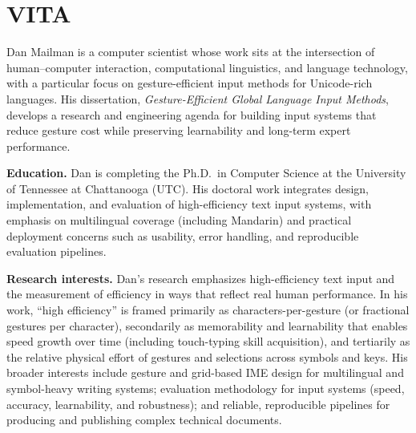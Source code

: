 

\cleardoublepage
\chapter*{VITA}


Dan Mailman is a computer scientist whose work sits at the intersection of human--computer interaction, computational linguistics, and language technology, with a particular focus on gesture-efficient input methods for Unicode-rich languages. His dissertation, \textit{Gesture-Efficient Global Language Input Methods}, develops a research and engineering agenda for building input systems that reduce gesture cost while preserving learnability and long-term expert performance.

\UTCOneSingleBlank

\textbf{Education.}
Dan is completing the Ph.D.\ in Computer Science at the University of Tennessee at Chattanooga (UTC). His doctoral work integrates design, implementation, and evaluation of high-efficiency text input systems, with emphasis on multilingual coverage (including Mandarin) and practical deployment concerns such as usability, error handling, and reproducible evaluation pipelines.

\UTCOneSingleBlank

\textbf{Research interests.}
Dan’s research emphasizes high-efficiency text input and the measurement of efficiency in ways that reflect real human performance. In his work, ``high efficiency'' is framed primarily as characters-per-gesture (or fractional gestures per character), secondarily as memorability and learnability that enables speed growth over time (including touch-typing skill acquisition), and tertiarily as the relative physical effort of gestures and selections across symbols and keys. His broader interests include gesture and grid-based IME design for multilingual and symbol-heavy writing systems; evaluation methodology for input systems (speed, accuracy, learnability, and robustness); and reliable, reproducible pipelines for producing and publishing complex technical documents.

